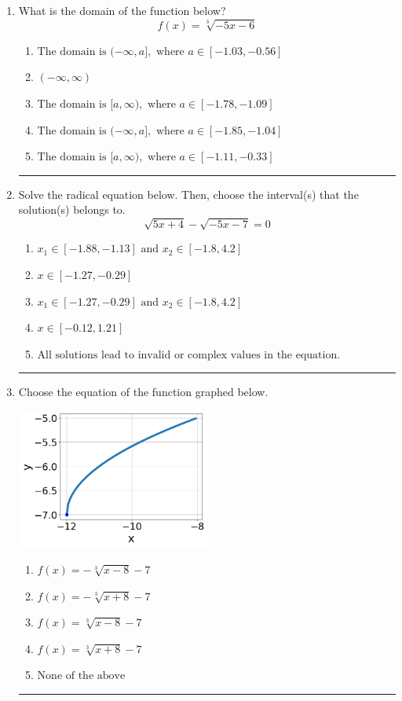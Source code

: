 \documentclass[14pt]{extbook}
\newcommand{\litem}[1]{\item#1\hspace*{-1cm}\rule{\textwidth}{0.4pt}}
\begin{document}
\begin{enumerate}
{\begin{enumerate}[label=\Alph*.]
\end{enumerate} }
\litem{
What is the domain of the function below?\[ f(x) = \sqrt[3]{-5 x - 6} \]\begin{enumerate}[label=\Alph*.]
\item \( \text{The domain is } (-\infty, a], \text{   where } a \in [-1.03, -0.56] \)
\item \( (-\infty, \infty) \)
\item \( \text{The domain is } [a, \infty), \text{   where } a \in [-1.78, -1.09] \)
\item \( \text{The domain is } (-\infty, a], \text{   where } a \in [-1.85, -1.04] \)
\item \( \text{The domain is } [a, \infty), \text{   where } a \in [-1.11, -0.33] \)

\end{enumerate} }
\litem{
Solve the radical equation below. Then, choose the interval(s) that the solution(s) belongs to.\[ \sqrt{5 x + 4} - \sqrt{-5 x - 7} = 0 \]\begin{enumerate}[label=\Alph*.]
\item \( x_1 \in [-1.88, -1.13] \text{ and } x_2 \in [-1.8,4.2] \)
\item \( x \in [-1.27,-0.29] \)
\item \( x_1 \in [-1.27, -0.29] \text{ and } x_2 \in [-1.8,4.2] \)
\item \( x \in [-0.12,1.21] \)
\item \( \text{All solutions lead to invalid or complex values in the equation.} \)

\end{enumerate} }
\litem{
Choose the equation of the function graphed below.
\begin{center}
    \includegraphics[width=0.5\textwidth]{../Figures/radicalGraphToEquationCopyA.png}
\end{center}
\begin{enumerate}[label=\Alph*.]
\item \( f(x) = - \sqrt[3]{x - 8} - 7 \)
\item \( f(x) = - \sqrt[3]{x + 8} - 7 \)
\item \( f(x) = \sqrt[3]{x - 8} - 7 \)
\item \( f(x) = \sqrt[3]{x + 8} - 7 \)
\item \( \text{None of the above} \)

\end{enumerate} }
\end{enumerate}
\end{document}
